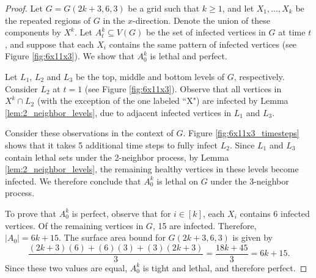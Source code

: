 \begin{proof}
Let $G=G(2k+3,6,3)$ be a grid such that $k \geq 1$, and let $X_1, \dots, X_{k}$ be the repeated regions of $G$ in the $x$-direction. Denote the union of these components by $X^k$. Let $A_t^k \subseteq V(G)$ be the set of infected vertices in $G$ at time $t$, and suppose that each $X_i$ contains the same pattern of infected vertices (see Figure \ref{fig:6x11x3}). We show that $A_0^k$ is lethal and perfect. 

Let $L_1$, $L_2$ and $L_3$ be the top, middle and bottom levels of $G$, respectively. Consider $L_2$ at $t=1$ (see Figure \ref{fig:6x11x3}). Observe that all vertices in $X^k \cap L_2$ (with the exception of the one labeled ``X") are infected by Lemma \ref{lem:2_neighbor_levels}, due to adjacent infected vertices in $L_1$ and $L_3$. 

Consider these observations in the context of $G$. Figure \ref{fig:6x11x3_timesteps} shows that it takes 5 additional time steps to fully infect $L_2$. Since $L_1$ and $L_3$ contain lethal sets under the 2-neighbor process, by Lemma \ref{lem:2_neighbor_levels}, the remaining healthy vertices in these levels become infected. We therefore conclude that $A_0^k$ is lethal on $G$ under the 3-neighbor process.

To prove that $A_0^k$ is perfect, observe that for $i \in [k]$, each $X_i$ contains 6 infected vertices. Of the remaining vertices in $G$, 15 are infected. Therefore, $|A_0| = 6k+15$. The surface area bound for $G(2k+3,6,3)$ is given by
$$\frac{(2k+3)(6) + (6)(3) + (3)(2k+3)}{3} = \frac{18k + 45}{3} = 6k+15.$$
Since these two values are equal, $A_0^k$ is tight and lethal, and therefore perfect.
\end{proof}


